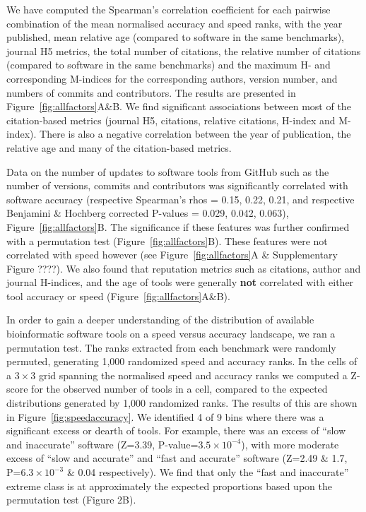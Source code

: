 \documentclass[fleqn,10pt]{SelfArx} %
\begin{document}
We have computed the Spearman’s correlation coefficient for each
pairwise combination of the mean normalised accuracy and speed ranks,
with the year published, mean relative age (compared to software in the
same benchmarks), journal H5 metrics, the total number of citations,
the relative number of citations (compared to software in the same
benchmarks) and the maximum H- and corresponding M-indices for the corresponding
authors, version number, and numbers of commits and contributors.
The results are presented in Figure~\ref{fig:allfactors}A\&B. We find
significant associations between most of the citation-based metrics
(journal H5, citations, relative citations, H-index and
M-index). There is also a negative correlation between the year of
publication, the relative age and many of the citation-based metrics.

Data on the
number of updates to software tools from GitHub such as the number of versions,
commits and contributors was significantly correlated with 
software accuracy (respective Spearman’s rhos = {\color{black}0.15, 0.22, 0.21,} and respective Benjamini \& Hochberg corrected P-values = {\color{black}0.029, 0.042, 0.063}), Figure~\ref{fig:allfactors}B. 
The significance if these features was further confirmed with a permutation test (Figure~\ref{fig:allfactors}B).
These features were not correlated with speed however (see Figure~\ref{fig:allfactors}A \& Supplementary Figure ????).
We also found that reputation metrics such as citations, author and journal H-indices, and the age
of tools were generally \textbf{not} correlated with either tool
accuracy or speed (Figure~\ref{fig:allfactors}A\&B). 


In order to gain a deeper understanding of the distribution of
available bioinformatic software tools on a speed versus accuracy
landscape, we ran a permutation test. The ranks extracted
from each benchmark were randomly permuted, generating 1,000
randomized speed and accuracy ranks. In the cells of a $3\times3$
grid spanning the normalised speed and accuracy ranks we computed a
Z-score for the observed number of tools in a cell, compared to the
expected distributions generated by 1,000 randomized ranks. The results
of this are shown in Figure~\ref{fig:speedaccuracy}. We identified {\color{black}4}
of 9 bins where there was a significant excess or dearth of tools. For
example, there was an excess of ``slow and inaccurate'' software ({\color{black}Z=3.39,
P-value=$3.5\times 10^{-4}$}), with more moderate excess of ``slow and accurate'' and ``fast and accurate'' software (Z=2.49 \& 1.7, P=$6.3\times 10^{-3}$ \& 0.04 respectively). We find that only the ``fast and inaccurate'' extreme class is at approximately the
expected proportions based upon the permutation test (Figure 2B).
\end{document}
